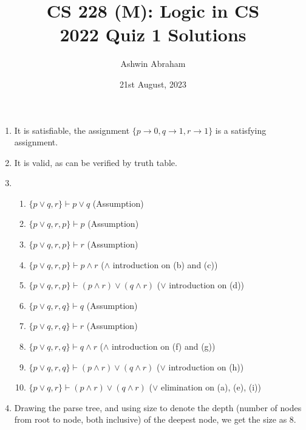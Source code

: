 \documentclass{article}
\title{CS 228 (M): Logic in CS\\2022 Quiz 1 Solutions}				%
\author{Ashwin Abraham}%
\date{21st August, 2023}		%
\begin{document}
\maketitle




\begin{enumerate} 
	\item It is satisfiable, the assignment $\{p \rightarrow 0, q \rightarrow 1, r \rightarrow 1\}$ is a satisfying assignment.
	\item It is valid, as can be verified by truth table.
	\item \begin{enumerate}
        \item $\{p \lor q, r\} \vdash p \lor q$ (Assumption)
        \item $\{p \lor q, r, p\} \vdash p$ (Assumption)
        \item $\{p \lor q, r, p\} \vdash r$ (Assumption)
        \item $\{p \lor q, r, p\} \vdash p \land r$ ($\land$ introduction on (b) and (c))
        \item $\{p \lor q, r, p\} \vdash (p \land r) \lor (q \land r)$ ($\lor$ introduction on (d))
        \item $\{p \lor q, r, q\} \vdash q$ (Assumption)
        \item $\{p \lor q, r, q\} \vdash r$ (Assumption)
        \item $\{p \lor q, r, q\} \vdash q \land r$ ($\land$ introduction on (f) and (g))
        \item $\{p \lor q, r, q\} \vdash (p \land r) \lor (q \land r)$ ($\lor$ introduction on (h))
        \item $\{p \lor q, r\} \vdash (p \land r) \lor (q \land r)$ ($\lor$ elimination on (a), (e), (i))
    \end{enumerate}
    \item Drawing the parse tree, and using size to denote the depth (number of nodes from root to node, both inclusive) of the deepest node, we get the size as $8$.

\end{enumerate}
\end{document}
